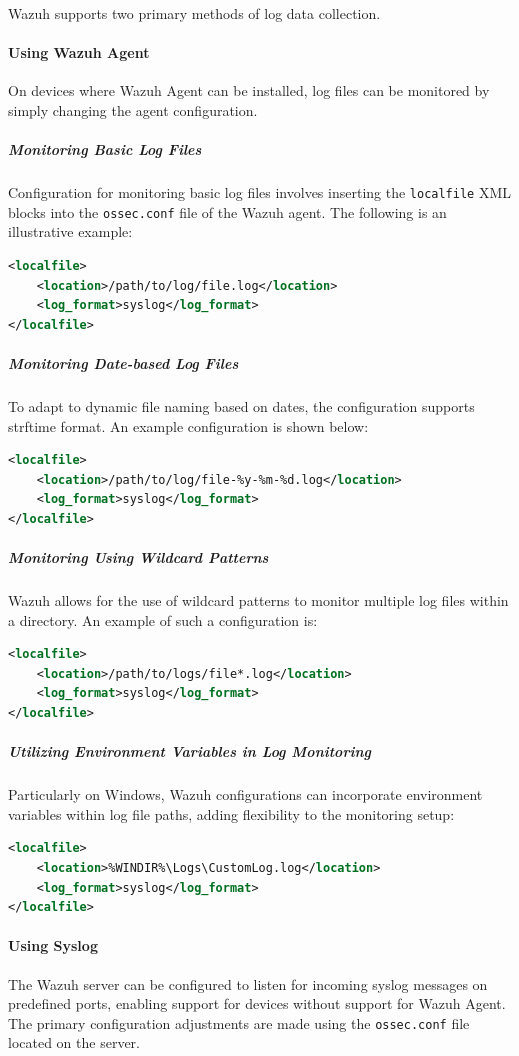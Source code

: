 Wazuh supports two primary methods of log data collection.
\paragraph{Using Wazuh Agent}
On devices where Wazuh Agent can be installed, log files can be monitored by simply changing the agent configuration.

\subparagraph{Monitoring Basic Log Files}
Configuration for monitoring basic log files involves inserting the \texttt{localfile} XML blocks into the \texttt{ossec.conf} file of the Wazuh agent. The following is an illustrative example:

\begin{lstlisting}[language=XML]
<localfile>
    <location>/path/to/log/file.log</location>
    <log_format>syslog</log_format>
</localfile>
\end{lstlisting}

\subparagraph{Monitoring Date-based Log Files}
To adapt to dynamic file naming based on dates, the configuration supports strftime format. An example configuration is shown below:

\begin{lstlisting}[language=XML]
<localfile>
    <location>/path/to/log/file-%y-%m-%d.log</location>
    <log_format>syslog</log_format>
</localfile>
\end{lstlisting}

\subparagraph{Monitoring Using Wildcard Patterns}
Wazuh allows for the use of wildcard patterns to monitor multiple log files within a directory. An example of such a configuration is:

\begin{lstlisting}[language=XML]
<localfile>
    <location>/path/to/logs/file*.log</location>
    <log_format>syslog</log_format>
</localfile>
\end{lstlisting}

\subparagraph{Utilizing Environment Variables in Log Monitoring}
Particularly on Windows, Wazuh configurations can incorporate environment variables within log file paths, adding flexibility to the monitoring setup:

\begin{lstlisting}[language=XML]
<localfile>
    <location>%WINDIR%\Logs\CustomLog.log</location>
    <log_format>syslog</log_format>
</localfile>
\end{lstlisting}

\paragraph{Using Syslog}
The Wazuh server can be configured to listen for incoming syslog messages on predefined ports, enabling support for devices without support for Wazuh Agent. The primary configuration adjustments are made using the \texttt{ossec.conf} file located on the server.

